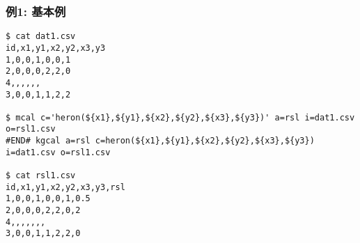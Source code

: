 
\subsubsection*{例1: 基本例}


\begin{Verbatim}[baselinestretch=0.7,frame=single]
$ cat dat1.csv
id,x1,y1,x2,y2,x3,y3
1,0,0,1,0,0,1
2,0,0,0,2,2,0
4,,,,,,
3,0,0,1,1,2,2

$ mcal c='heron(${x1},${y1},${x2},${y2},${x3},${y3})' a=rsl i=dat1.csv o=rsl1.csv
#END# kgcal a=rsl c=heron(${x1},${y1},${x2},${y2},${x3},${y3}) i=dat1.csv o=rsl1.csv

$ cat rsl1.csv
id,x1,y1,x2,y2,x3,y3,rsl
1,0,0,1,0,0,1,0.5
2,0,0,0,2,2,0,2
4,,,,,,,
3,0,0,1,1,2,2,0
\end{Verbatim}
